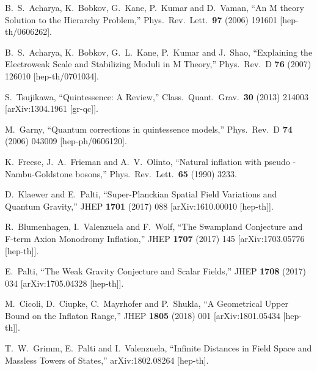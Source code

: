 \documentclass[11pt,a4paper]{article}
\begin{document}
\begin{itemize}
\begin{thebibliography}{99}
  B.~S.~Acharya, K.~Bobkov, G.~Kane, P.~Kumar and D.~Vaman,
  ``An M theory Solution to the Hierarchy Problem,''
  Phys.\ Rev.\ Lett.\  {\bf 97} (2006) 191601
  [hep-th/0606262].

  B.~S.~Acharya, K.~Bobkov, G.~L.~Kane, P.~Kumar and J.~Shao,
  ``Explaining the Electroweak Scale and Stabilizing Moduli in M Theory,''
  Phys.\ Rev.\ D {\bf 76} (2007) 126010
  [hep-th/0701034].


  S.~Tsujikawa,
  ``Quintessence: A Review,''
  Class.\ Quant.\ Grav.\  {\bf 30} (2013) 214003
  [arXiv:1304.1961 [gr-qc]].
  
  M.~Garny,
  ``Quantum corrections in quintessence models,''
  Phys.\ Rev.\ D {\bf 74} (2006) 043009
  [hep-ph/0606120].

  K.~Freese, J.~A.~Frieman and A.~V.~Olinto,
  ``Natural inflation with pseudo - Nambu-Goldstone bosons,''
  Phys.\ Rev.\ Lett.\  {\bf 65} (1990) 3233.

  D.~Klaewer and E.~Palti,
  ``Super-Planckian Spatial Field Variations and Quantum Gravity,''
  JHEP {\bf 1701} (2017) 088
  [arXiv:1610.00010 [hep-th]].
	
  R.~Blumenhagen, I.~Valenzuela and F.~Wolf,
  ``The Swampland Conjecture and F-term Axion Monodromy Inflation,''
  JHEP {\bf 1707} (2017) 145
  [arXiv:1703.05776 [hep-th]].

  E.~Palti,
  ``The Weak Gravity Conjecture and Scalar Fields,''
  JHEP {\bf 1708} (2017) 034
  [arXiv:1705.04328 [hep-th]].
	
  M.~Cicoli, D.~Ciupke, C.~Mayrhofer and P.~Shukla,
  ``A Geometrical Upper Bound on the Inflaton Range,''
  JHEP {\bf 1805} (2018) 001
  [arXiv:1801.05434 [hep-th]].
	
  T.~W.~Grimm, E.~Palti and I.~Valenzuela,
  ``Infinite Distances in Field Space and Massless Towers of States,''
  arXiv:1802.08264 [hep-th].
	

\end{thebibliography}
\end{itemize}
\end{document}
